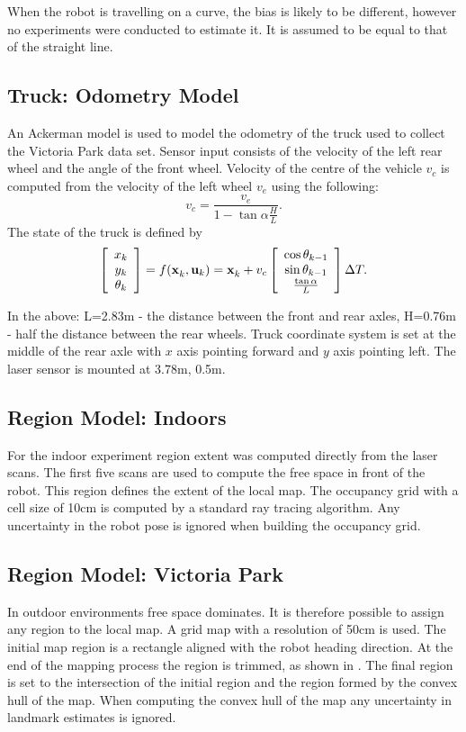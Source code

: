 When the robot is travelling on a curve, the bias is likely to be
different, however no experiments were conducted to estimate it. It is
assumed to be equal to that of the straight line.


\subsection{Truck: Odometry Model}

An Ackerman model is used to model the odometry of the truck used to
collect the Victoria Park data set. Sensor input consists of the
velocity of the left rear wheel and the angle of the front
wheel. Velocity of the centre of the vehicle $v_c$ is computed from the
velocity of the left wheel $v_e$ using the following:
$$
v_c = \frac{v_e}{1 - \tan \alpha \frac{H}{L}}.
$$
The state of the truck is defined by
$$
\Vector{x_k\\y_k\\\theta_k} = f(\x{k}{}{},\U{k}) = 
\x{k}{}{} + v_c \Vector{\cos \theta_{k-1} \\ \sin
  \theta_{k-1} \\ \frac{\tan \alpha}{L}} \Delta T.
$$

In the above: L=2.83m - the distance between the front and rear axles,
H=0.76m - half the distance between the rear wheels. Truck coordinate
system is set at the middle of the rear axle with $x$ axis pointing
forward and $y$ axis pointing left. The laser sensor is mounted at 3.78m,
0.5m.

\subsection{Region Model: Indoors}

For the indoor experiment region extent was computed directly from the
laser scans. The first five scans are used to compute the free space
in front of the robot. This region defines the extent of the local
map.  The occupancy grid with a cell size of 10cm is computed by a
standard ray tracing algorithm. Any uncertainty in the robot pose is
ignored when building the occupancy grid.

\subsection{Region Model: Victoria Park}

In outdoor environments free space dominates. It is therefore possible
to assign any region to the local map. A grid map with a resolution of
50cm is used. The initial map region is a rectangle aligned with the
robot heading direction. At the end of the mapping process the region
is trimmed, as shown in . The
final region is set to the intersection of the initial region and the
region formed by the convex hull of the map. When computing the convex
hull of the map any uncertainty in landmark estimates is ignored.

